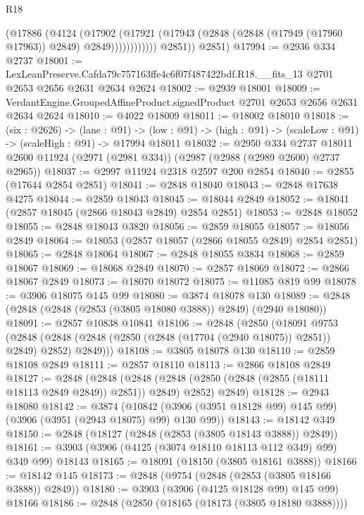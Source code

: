 \begin{lexlean}{R18}
\begin{coremodule}
                      (@17886
                        (@4124
                          (@17902
                            (@17921
                              (@17943
                                (@2848 (@2848 (@17949 (@17960 @17963)) @2849) @2849))))))))))))
          @2851))
      @2851)
@17994 := @2936 @334 @2737
@18001 := LexLeanPreserve.Cafda79c757163ffe4c6f07f487422bdf.R18.__fits_13
    @2701
    @2653
    @2656
    @2631
    @2634
    @2624
@18002 := @2939 @18001
@18009 := VerdantEngine.GroupedAffineProduct.signedProduct @2701 @2653 @2656 @2631 @2634 @2624
@18010 := @4022 @18009
@18011 := @18002 @18010
@18018 := (six : @2626) ->
  (lane : @91) ->
  (low : @91) -> (high : @91) -> (scaleLow : @91) -> (scaleHigh : @91) -> @17994 @18011
@18032 := @2950
    @334
    @2737
    @18011
    @2600
    @11924
    (@2971 (@2981 @334))
    (@2987 (@2988 (@2989 @2600) @2737 @2965))
@18037 := @2997 @11924 @2318 @2597 @200 @2854
@18040 := @2855 (@17644 @2854 @2851)
@18041 := @2848 @18040
@18043 := @2848 @17638 @4275
@18044 := @2859 @18043
@18045 := @18044 @2849
@18052 := @18041 (@2857 @18045 (@2866 @18043 @2849) @2854 @2851)
@18053 := @2848 @18052
@18055 := @2848 @18043 @3820
@18056 := @2859 @18055
@18057 := @18056 @2849
@18064 := @18053 (@2857 @18057 (@2866 @18055 @2849) @2854 @2851)
@18065 := @2848 @18064
@18067 := @2848 @18055 @3834
@18068 := @2859 @18067
@18069 := @18068 @2849
@18070 := @2857 @18069
@18072 := @2866 @18067 @2849
@18073 := @18070 @18072
@18075 := @11085 @819 @99
@18078 := @3906 @18075 @145 @99
@18080 := @3874 @18078 @130
@18089 := @2848 (@2848 (@2848 (@2853 (@3805 @18080 @3888)) @2849) (@2940 @18080))
@18091 := @2857 @10838 @10841
@18106 := @2848
    (@2850
      (@18091
        @9753
        (@2848 (@2848 (@2848 (@2850 (@2848 (@17704 (@2940 @18075)) @2851)) @2849) @2852) @2849)))
@18108 := @3805 @18078 @130
@18110 := @2859 @18108 @2849
@18111 := @2857 @18110
@18113 := @2866 @18108 @2849
@18127 := @2848
    (@2848
      (@2848 (@2848 (@2850 (@2848 (@2855 (@18111 @18113 @2849 @2849)) @2851)) @2849) @2852)
      @2849)
@18128 := @2943 @18080
@18142 := @3874
    (@10842 (@3906 (@3951 @18128 @99) @145 @99) (@3906 (@3951 (@2943 @18075) @99) @130 @99))
@18143 := @18142 @349
@18150 := @2848 (@18127 (@2848 (@2853 (@3805 @18143 @3888)) @2849))
@18161 := @3903 (@3906 (@4125 (@3074 @18110 @18113 @112 @349) @99) @349 @99) @18143
@18165 := @18091 (@18150 (@3805 @18161 @3888))
@18166 := @18142 @145
@18173 := @2848 (@9754 (@2848 (@2853 (@3805 @18166 @3888)) @2849))
@18180 := @3903 (@3906 (@4125 @18128 @99) @145 @99) @18166
@18186 := @2848 (@2850 (@18165 (@18173 (@3805 @18180 @3888))))

\end{coremodule}
\end{lexlean}

